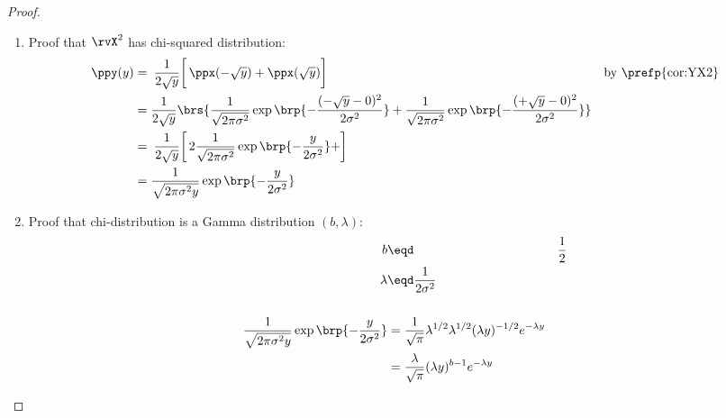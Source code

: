 \begin{proof}
\begin{enumerate}
\item Proof that $\rvX^2$ has chi-squared distribution:
\begin{align*}
  \ppy(y)
    &= \left.\left.\frac{1}{2\sqrt{y}}\right[
       \ppx(-\sqrt{y}) + \ppx( \sqrt{y}) \right]
    && \text{by \prefp{cor:YX2}}
  \\&= \frac{1}{2\sqrt{y}}
       \brs{
         \frac{1}{\sqrt{2\pi\sigma^2}} \exp\brp{-\frac{(-\sqrt{y}-0)^2}{2\sigma^2}}+
         \frac{1}{\sqrt{2\pi\sigma^2}} \exp\brp{-\frac{(+\sqrt{y}-0)^2}{2\sigma^2}}
       }
  \\&= \left.\left.\frac{1}{2\sqrt{y}}\right[
       2\frac{1}{\sqrt{2\pi\sigma^2}} \exp\brp{-\frac{y}{2\sigma^2}}+
       \right]
  \\&= \frac{1}{\sqrt{2\pi \sigma^2 y}} \exp\brp{-\frac{y}{2\sigma^2}}
\end{align*}

\item Proof that chi-distribution is a Gamma distribution $(b,\lambda)$:
\begin{align*}
  b &\eqd& \frac{1}{2} \\
  \lambda &\eqd \frac{1}{2\sigma^2} \\
\\
  \frac{1}{\sqrt{2\pi\sigma^2y}}\exp\brp{-\frac{y}{2\sigma^2}}
    &= \frac{1}{\sqrt{\pi}}\lambda^{1/2} \lambda^{1/2} (\lambda y)^{-1/2} e^{-\lambda y}
  \\&= \frac{\lambda}{\sqrt{\pi}} (\lambda y)^{b-1} e^{-\lambda y}
\end{align*}

\end{enumerate}
\end{proof}

